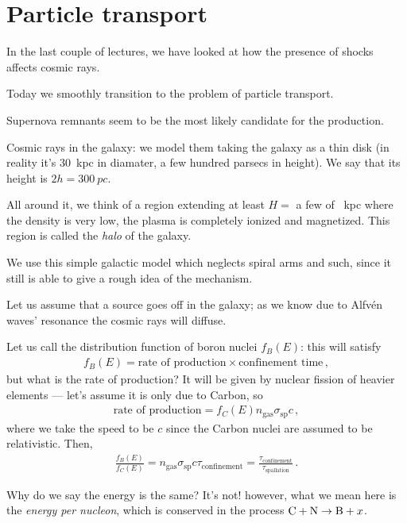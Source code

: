 \documentclass[main.tex]{subfiles}
\begin{document}
\section{Particle transport}


In the last couple of lectures, we have looked at how the 
presence of shocks affects cosmic rays. 

Today we smoothly transition to the problem of particle transport. 

Supernova remnants seem to be the most likely candidate for the production. 

Cosmic rays in the galaxy: 
we model them taking the galaxy as a thin disk
(in reality it's \SI{30}{kpc} in diamater, a few hundred parsecs in height). 
We say that its height is \(2h = \SI{300}{pc}\). 

All around it, we think of a region extending at least \(H=\) a few of \SI{}{kpc} where the density is very low, the plasma is completely ionized and magnetized. 
This region is called the \emph{halo} of the galaxy. 

We use this simple galactic model which neglects spiral arms and such,
since it still is able to give a rough idea of the mechanism. 

Let us assume that a source goes off in the galaxy; as we know due to Alfvén waves' resonance the cosmic rays will diffuse. 

Let us call the distribution function of boron nuclei \(f_B (E)\): this will satisfy 
%
\begin{align}
f_B(E) = \text{rate of production} \times \text{confinement time}
\,,
\end{align}
%
but what is the rate of production? It will be given by nuclear fission of heavier elements --- let's assume it is only due to Carbon, so
%
\begin{align}
\text{rate of production} = f _C (E) n _{\text{gas}} \sigma _{\text{sp}} c
\,,
\end{align}
%
where we take the speed to be \(c\) since the Carbon nuclei are assumed to be relativistic. Then, 
%
\begin{align}
\frac{f_B (E)}{f_C(E)} = n _{\text{gas}} \sigma _{\text{sp}} c \tau _{\text{confinement}} = \frac{\tau _{\text{confinement}}}{\tau _{\text{spallation}}}
\,.
\end{align}

Why do we say the energy is the same? 
It's not! however, what we mean here is the 
\emph{energy per nucleon}, which is conserved in the process \(\ce{C} + \ce{N} \to \ce{B} + x\). 
\end{document}
